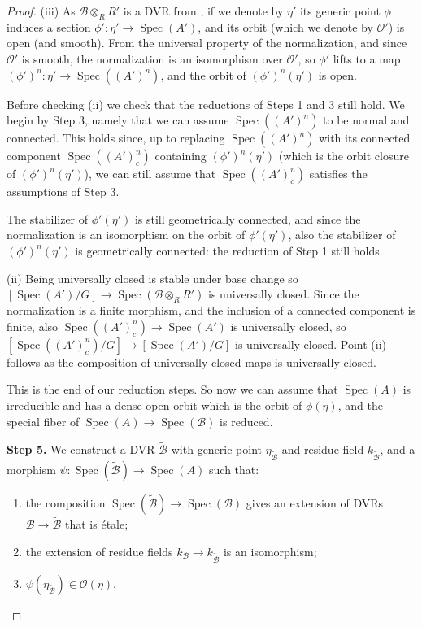 \documentclass{amsart}
\newcommand{\cB}{\mathcal{B}}
\newcommand{\cO}{\mathcal{O}}
\newcommand{\qB}{R}
\newcommand{\qR}{\cB}
\newcommand{\spec}{\operatorname{Spec}}
\theoremstyle{definition}
\begin{document}
\begin{proof}
(iii) As $\qR\otimes_\qB \qB'$ is a DVR from ,
if we denote by $\eta'$ its generic point $\phi$ induces a section $\phi':\eta'\to \spec(A')$, and its orbit (which we denote by $\cO'$) is open (and smooth). From the universal property of the normalization, and since $\cO'$ is smooth, the normalization is an isomorphism over $\cO'$, so $\phi'$ lifts to a map $(\phi')^n: \eta'\to \spec((A')^n)$, and the orbit of $(\phi')^n(\eta')$ is open. 

Before checking (ii) we  check that the reductions of Steps 1 and 3 still hold. We begin by Step 3, namely that we can assume $\spec((A')^n)$ to be normal and connected. This holds since, up to replacing $\spec((A')^n)$ with its connected component $\spec((A')^n_c)$ containing $(\phi')^n(\eta')$ (which is the orbit closure of $(\phi')^n(\eta')$), we can still assume that 
$\spec((A')^n_c)$ satisfies the assumptions of Step 3. 

The stabilizer of $\phi'(\eta')$ is still geometrically connected, and since the normalization is an isomorphism on the orbit of $\phi'(\eta')$, also the stabilizer of $(\phi')^n(\eta')$ is geometrically connected: the reduction of Step 1 still holds.

(ii) Being universally closed is stable under base change so $[\spec(A')/G]\to \spec(\qR\otimes_\qB \qB')$ is universally closed. Since the normalization is a finite morphism, and the inclusion of a connected component is finite, also $\spec((A')^n_c)\to \spec(A')$ is universally closed, so 
$[\spec((A')^n_c)/G]\to [\spec(A')/G]$ is universally closed. Point (ii) follows as the composition of universally closed maps is universally closed.


This is the end of our reduction steps. So now we can assume that $\spec(A)$ is irreducible and has a dense open orbit which is the orbit of $\phi(\eta)$, and the special fiber of $\spec(A)\to \spec(\qR)$ is reduced.

\textbf{Step 5.} We construct a DVR $\widetilde{\qR}$ with generic point $\eta_{\widetilde{\qR}}$ and residue field $k_{\widetilde{\qR}}$, and a morphism $\psi:\spec(\widetilde{\qR})\to \spec(A)$ such that:
\begin{enumerate}
    \item the composition $\spec(\widetilde{\qR})\to \spec(\qR)$ gives an extension of DVRs $\qR\to \widetilde{\qR}$ that is \'etale;
    \item the extension of residue fields $k_\qR\to k_{\widetilde{\qR}}$ is an isomorphism;
    \item $\psi(\eta_{\widetilde{\qR}})\in \cO(\eta)$.
\end{enumerate}


\end{proof}
\end{document}
